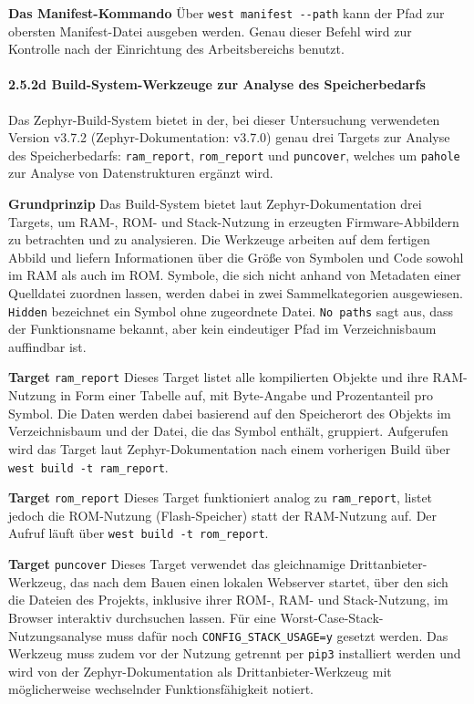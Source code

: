 \textbf{Das Manifest-Kommando }Über \lstinline[style=fileinline]|west manifest --path| kann der Pfad zur obersten Manifest-Datei ausgeben werden. Genau dieser Befehl wird zur Kontrolle nach der Einrichtung des Arbeitsbereichs benutzt.

\paragraph*{\textbf{2.5.2d Build-System-Werkzeuge zur Analyse des Speicherbedarfs}}
Das Zephyr-Build-System bietet in der, bei dieser Untersuchung verwendeten Version v3.7.2 (Zephyr-Dokumentation: v3.7.0) genau drei Targets zur Analyse des Speicherbedarfs: \lstinline[style=fileinline]|ram_report|, \lstinline[style=fileinline]|rom_report| und \lstinline[style=fileinline]|puncover|, welches um \lstinline[style=fileinline]|pahole| zur Analyse von Datenstrukturen ergänzt wird.

\textbf{Grundprinzip} Das Build-System bietet laut Zephyr-Dokumentation drei Targets, um RAM-, ROM- und Stack-Nutzung in erzeugten Firmware-Abbildern zu betrachten und zu analysieren. Die Werkzeuge arbeiten auf dem fertigen Abbild und liefern Informationen über die Größe von Symbolen und Code sowohl im RAM als auch im ROM. Symbole, die sich nicht anhand von Metadaten einer Quelldatei zuordnen lassen, werden dabei in zwei Sammelkategorien ausgewiesen. \lstinline[style=fileinline]|Hidden| bezeichnet ein Symbol ohne zugeordnete Datei. \lstinline[style=fileinline]|No paths| sagt aus, dass der Funktionsname bekannt, aber kein eindeutiger Pfad im Verzeichnisbaum auffindbar ist.

\textbf{Target }\lstinline[style=fileinline]|ram_report| Dieses Target listet alle kompilierten Objekte und ihre RAM-Nutzung in Form einer Tabelle auf, mit Byte-Angabe und Prozentanteil pro Symbol. Die Daten werden dabei basierend auf den Speicherort des Objekts im Verzeichnisbaum und der Datei, die das Symbol enthält, gruppiert. Aufgerufen wird das Target laut Zephyr-Dokumentation nach einem vorherigen Build über \lstinline[style=fileinline]|west build -t ram_report|.

\textbf{Target }\lstinline[style=fileinline]|rom_report| Dieses Target funktioniert analog zu \lstinline[style=fileinline]|ram_report|, listet jedoch die ROM-Nutzung (Flash-Speicher) statt der RAM-Nutzung auf. Der Aufruf läuft über \lstinline[style=fileinline]|west build -t rom_report|.

\textbf{Target }\lstinline[style=fileinline]|puncover| Dieses Target verwendet das gleichnamige Drittanbieter-Werkzeug, das nach dem Bauen einen lokalen Webserver startet, über den sich die Dateien des Projekts, inklusive ihrer ROM-, RAM- und Stack-Nutzung, im Browser interaktiv durchsuchen lassen. Für eine Worst-Case-Stack-Nutzungsanalyse muss dafür noch \lstinline[style=fileinline]|CONFIG_STACK_USAGE=y| gesetzt werden. Das Werkzeug muss zudem vor der Nutzung getrennt per \lstinline[style=fileinline]|pip3| installiert werden und wird von der Zephyr-Dokumentation als Drittanbieter-Werkzeug mit möglicherweise wechselnder Funktionsfähigkeit notiert.

